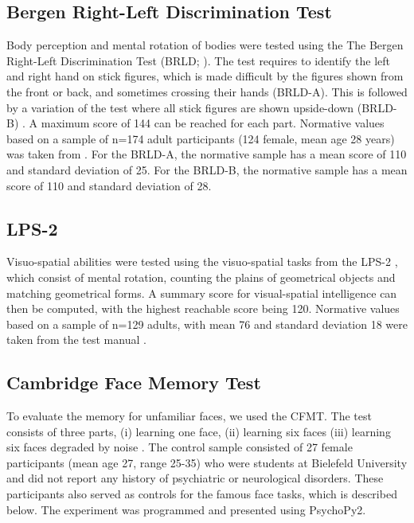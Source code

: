 \documentclass[fleqn,10pt]{SelfArx} %
\begin{document}
\subsection*{Bergen Right-Left Discrimination Test}
Body perception and mental rotation of bodies were tested using the The Bergen Right-Left Discrimination Test (BRLD; \citet{Ofte_2002}). The test requires to identify the left and right hand on stick figures, which is made difficult by the figures shown from the front or back, and sometimes crossing their hands (BRLD-A). This is followed by a variation of the test where all stick figures are shown upside-down (BRLD-B) \citep{Grewe_2014}. A maximum score of 144 can be reached for each part. Normative values based on a sample of n=174 adult participants (124 female, mean age 28 years) was taken from \citet{Grewe_2014}. For the BRLD-A, the normative sample has a mean score of 110 and standard deviation of 25. For the BRLD-B, the normative sample has a mean score of 110 and standard deviation of 28.

\subsection*{LPS-2}
Visuo-spatial abilities were tested using the visuo-spatial tasks from the LPS-2 \citep{Horn}, which consist of mental rotation, counting the plains of geometrical objects and matching geometrical forms. A summary score for visual-spatial intelligence can then be computed, with the highest reachable score being 120. Normative values based on a sample of n=129 adults, with mean 76 and standard deviation 18 were taken from the test manual \citep{Horn}.

\subsection*{Cambridge Face Memory Test}
To evaluate the memory for unfamiliar faces, we used the CFMT. The test consists of three parts, (i) learning one face, (ii) learning six faces (iii) learning six faces degraded by noise \citep{Duchaine_2006cfmt}. The control sample consisted of 27 female participants (mean age 27, range 25-35) who were students at Bielefeld University and did not report any history of psychiatric or neurological disorders. These participants also served as controls for the famous face tasks, which is described below. The experiment was programmed and presented using PsychoPy2.
\end{document}
